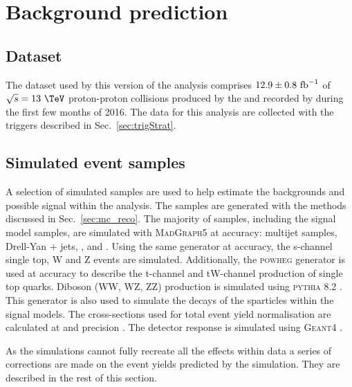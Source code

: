 \chapter{Background prediction} %
\label{chap:backgroundPred}

\section{Dataset} %
\label{sec:dataset}

The dataset used by this version of the analysis comprises
$12.9\pm0.8~\text{fb}^{-1}$ of $\sqrt{s}=13~\tev$ proton-proton collisions
produced by the \LHC and recorded by \CMS during the first few months
of 2016. The data for this analysis are collected with the triggers
described in Sec.~\ref{sec:trigStrat}.

\section{Simulated event samples} %
\label{sec:simEvents}

A selection of simulated \MC samples are used to help estimate the \SM
backgrounds and possible signal within the analysis. The samples are
generated with the methods discussed in Sec.~\ref{sec:mc_reco}. The
majority of samples, including the signal model samples, are simulated
with \textsc{MadGraph5} \cite{Alwall:2011uj,Alwall:2014hca} at \LO
accuracy: \QCD multijet samples, Drell-Yan + jets, \wj, \zj and \gj.
Using the same generator at \NLO accuracy, the s-channel single top,
{\ttbar}W and {\ttbar}Z events are simulated. Additionally, the
\textsc{powheg} \cite{Alioli:2010xd,Re:2010bp} generator is used at
\NLO accuracy to describe the t-channel and tW-channel production of
single top quarks. Diboson (WW, WZ, ZZ) production is simulated using
\textsc{pythia} 8.2 \cite{Sjostrand:2014zea}. This generator is also
used to simulate the decays of the sparticles within the signal
models. The cross-sections used for total event yield normalisation
are calculated at \NLO and \NNLO precision
\cite{Alwall:2011uj,Re:2010bp,Alioli:2009je,Gavin:2010az,Melia:2011tj,Czakon:2011xx,Gavin:2012sy}.
The detector response is simulated using \textsc{Geant4}
\cite{Agostinelli:2002hh}.

As the simulations cannot fully recreate all the effects within data a
series of corrections are made on the event yields predicted by the
simulation. They are described in the rest of this section.

